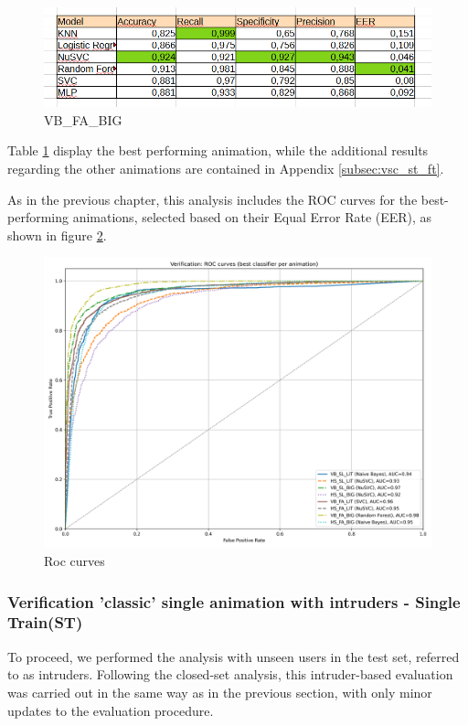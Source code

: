 \documentclass{article}
\begin{document}
\begin{figure}[ht]
    \centering
    \includegraphics[width = 0.8
    \textwidth]{Images/Results/Classic_procedure/Verification_single/st/VB_FA_BIG.png}
    \caption{VB\_FA\_BIG}
    \label{fig:VB_FA_BIG_cst}
\end{figure}

Table \ref{fig:VB_FA_BIG_cst} display the best performing animation, while the additional results regarding the other animations are contained in Appendix \ref{subsec:vsc_st_ft}.

As in the previous chapter, this analysis includes the ROC curves for the best-performing animations, selected based on their Equal Error Rate (EER), as shown in figure \ref{fig:roc_cst}.

\begin{figure}[ht]
    \centering
    \includegraphics[width = 0.6
    \textwidth]{Images/Results/Classic_procedure/Verification_single/st/Verification_single_roc_classic_st.png}
    \caption{Roc curves}
    \label{fig:roc_cst}
\end{figure}
\FloatBarrier


\subsubsection{Verification 'classic' single animation with intruders - Single Train(ST)}

To proceed, we performed the analysis with unseen users in the test set, referred to as intruders.
Following the closed-set analysis, this intruder-based evaluation was carried out in the same way as in the previous section, with only minor updates to the evaluation procedure.
\end{document}
